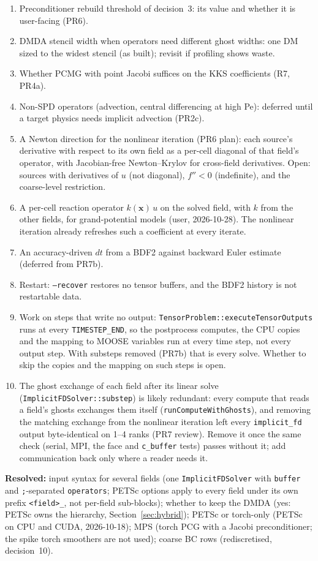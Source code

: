 \documentclass[11pt]{article}
\begin{document}
\begin{enumerate}[leftmargin=*]
\item Preconditioner rebuild threshold of decision~3: its value and whether
it is user-facing (PR6).
\item DMDA stencil width when operators need different ghost widths: one DM
sized to the widest stencil (as built); revisit if profiling shows waste.
\item Whether PCMG with point Jacobi suffices on the KKS coefficients (R7,
PR4a).
\item Non-SPD operators (advection, central differencing at high Pe):
deferred until a target physics needs implicit advection (PR2c).
\item A Newton direction for the nonlinear iteration (PR6 plan): each source's derivative
with respect to its own field as a per-cell diagonal of that field's operator, with
Jacobian-free Newton--Krylov for cross-field derivatives. Open: sources with derivatives of
$u$ (not diagonal), $f'' < 0$ (indefinite), and the coarse-level restriction.
\item A per-cell reaction operator $k(\mathbf{x})\,u$ on the solved field, with $k$ from the
other fields, for grand-potential models (user, 2026-10-28). The nonlinear iteration already
refreshes such a coefficient at every iterate.
\item An accuracy-driven $dt$ from a BDF2 against backward Euler estimate (deferred from PR7b).
\item Restart: \texttt{--recover} restores no tensor buffers, and the BDF2 history is not
restartable data.
\item Work on steps that write no output: \texttt{TensorProblem::executeTensorOutputs} runs at
every \texttt{TIMESTEP\_END}, so the postprocess computes, the CPU copies and the mapping to
MOOSE variables run at every time step, not every output step. With substeps removed (PR7b)
that is every solve. Whether to skip the copies and the mapping on such steps is open.
\item The ghost exchange of each field after its linear solve
(\texttt{ImplicitFDSolver::substep}) is likely redundant: every compute that reads a
field's ghosts exchanges them itself (\texttt{runComputeWithGhosts}), and removing the
matching exchange from the nonlinear iteration left every \texttt{implicit\_fd} output
byte-identical on 1--4 ranks (PR7 review). Remove it once the same check (serial, MPI, the
face and \texttt{c\_buffer} tests) passes without it; add communication back only where a
reader needs it.
\end{enumerate}

\textbf{Resolved:} input syntax for several fields (one
\texttt{ImplicitFDSolver} with \texttt{buffer} and \texttt{;}-separated
\texttt{operators}; PETSc options apply to every field under its own prefix
\texttt{<field>\_}, not per-field sub-blocks); whether to keep the DMDA
(yes: PETSc owns the hierarchy, Section~\ref{sec:hybrid}); PETSc or
torch-only (PETSc on CPU and CUDA, 2026-10-18); MPS (torch PCG with a Jacobi
preconditioner; the spike torch smoothers are not used); coarse BC rows
(rediscretised, decision~10).
\end{document}
